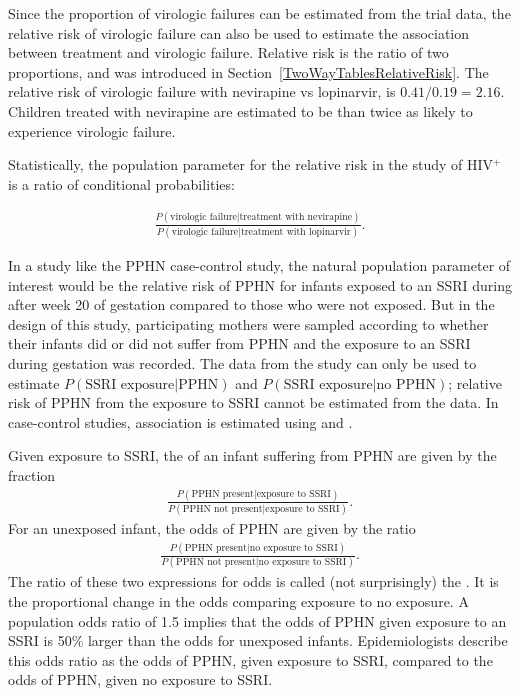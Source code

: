 Since the proportion of virologic failures can be estimated from the trial data, the relative risk of virologic failure can also be used to estimate the association between treatment and virologic failure. Relative risk is the ratio of two proportions, and was introduced in Section~\ref{TwoWayTablesRelativeRisk}.  The relative risk of virologic failure with nevirapine vs lopinarvir, is $0.41/0.19 = 2.16$.  Children treated with nevirapine are estimated to be than twice as likely to experience virologic failure.  

Statistically, the population parameter for the relative risk in the study of HIV$^+$ is a ratio of conditional probabilities:

\begin{align*}
  \frac{P(\text{virologic failure}| \text{treatment with nevirapine})}
  {P(\text{virologic failure}|\text{treatment with lopinarvir})}.
\end{align*}

In a study like the PPHN case-control study, the natural population parameter of interest would be the relative risk of PPHN for infants exposed to an SSRI during after week 20 of gestation compared to those who were not exposed. But in the design of this study, participating mothers were sampled according to whether their infants  did or did not suffer from PPHN and the exposure to an SSRI during gestation was recorded.  The data from the study can only be used to estimate $P(\text{SSRI exposure} | \text{PPHN})$ and  $P(\text{SSRI exposure} | \text{no PPHN})$; relative risk of PPHN from the exposure to SSRI cannot be estimated from the data.  In case-control studies, association is estimated using  and .

Given exposure to SSRI, the  of an infant suffering from PPHN are given by the fraction
\begin{align*}
  \frac{P(\text{PPHN present} | \text{exposure to SSRI})}
  {P(\text{PPHN not present} | \text{exposure to SSRI})}.
\end{align*}
For an unexposed infant, the odds of PPHN are given by the ratio
\begin{align*}
  \frac{P(\text{PPHN present} | \text{no exposure to SSRI})}
  {P(\text{PPHN not present} | \text{no exposure to SSRI})}.
\end{align*}
The ratio of these two expressions for odds is called (not surprisingly) the .  It is the proportional change in the odds comparing exposure to no exposure.  A population odds ratio of 1.5 implies that the odds of PPHN given exposure to an SSRI is 50\% larger than the odds for unexposed infants.  Epidemiologists describe this odds ratio as the odds of PPHN, given exposure to SSRI, compared to the odds of PPHN, given no exposure to SSRI.

